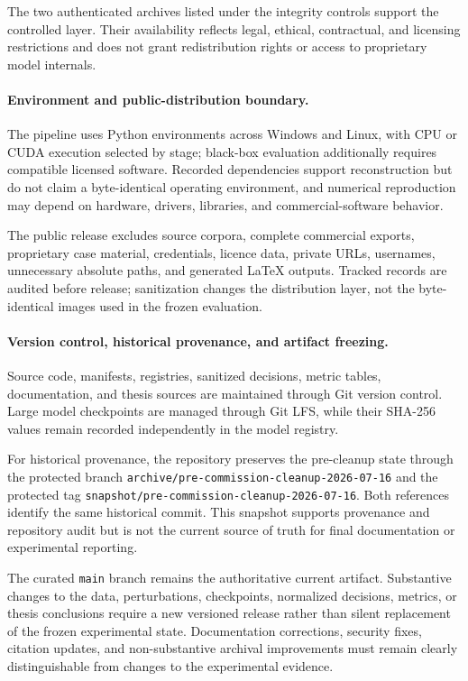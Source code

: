 The two authenticated archives listed under the integrity controls support the
controlled layer. Their availability reflects legal, ethical, contractual, and
licensing restrictions and does not grant redistribution rights or access to
proprietary model internals.

\paragraph{Environment and public-distribution boundary.}

The pipeline uses Python environments across Windows and Linux, with CPU or
CUDA execution selected by stage; black-box evaluation additionally requires
compatible licensed software. Recorded dependencies support reconstruction but
do not claim a byte-identical operating environment, and numerical reproduction
may depend on hardware, drivers, libraries, and commercial-software behavior.

The public release excludes source corpora, complete commercial exports,
proprietary case material, credentials, licence data, private URLs, usernames,
unnecessary absolute paths, and generated LaTeX outputs. Tracked records are
audited before release; sanitization changes the distribution layer, not the
byte-identical images used in the frozen evaluation.

\paragraph{Version control, historical provenance, and artifact freezing.}

Source code, manifests, registries, sanitized decisions, metric tables,
documentation, and thesis sources are maintained through Git version control.
Large model checkpoints are managed through Git LFS, while their
SHA-256 values remain recorded independently in the model registry.

For historical provenance, the repository preserves the pre-cleanup state
through the protected branch
\texttt{archive/pre-commission-cleanup-2026-07-16} and the protected tag
\texttt{snapshot/pre-commission-cleanup-2026-07-16}. Both references identify
the same historical commit. This snapshot supports provenance and repository
audit but is not the current source of truth for final documentation or
experimental reporting.

The curated \texttt{main} branch remains the authoritative current artifact.
Substantive changes to the data, perturbations, checkpoints, normalized
decisions, metrics, or thesis conclusions require a new versioned release
rather than silent replacement of the frozen experimental state.
Documentation corrections, security fixes, citation updates, and
non-substantive archival improvements must remain clearly distinguishable from
changes to the experimental evidence.

